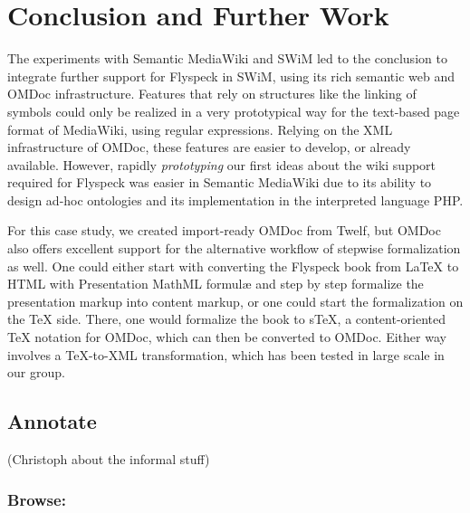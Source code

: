 
\section{Conclusion and Further Work}
\label{sec:conc}

The experiments with Semantic MediaWiki and SWiM led to the conclusion to
integrate further support for Flyspeck in SWiM, using its rich semantic web and
OMDoc infrastructure.  Features that rely on structures like the linking
of symbols could only be realized in a very prototypical way for the text-based
page format of MediaWiki, using regular expressions.  Relying on the XML
infrastructure of OMDoc, these features are easier to develop, or already
available.  However, rapidly \emph{prototyping} our first ideas about the wiki
support required for Flyspeck was easier in Semantic MediaWiki due to its
ability to design ad-hoc ontologies and its implementation in the interpreted
language PHP.

For this case study, we created import-ready OMDoc from Twelf, but OMDoc also
offers excellent support for the alternative workflow of stepwise formalization
as well\cite[chap.\ 4]{Kohlhase:omdoc1.2}.  One could either start with
converting the Flyspeck book from {\LaTeX} to HTML with Presentation MathML
formulæ and step by step formalize the presentation markup into content markup,
or one could start the formalization on the {\TeX} side.  There, one would
formalize the book to s\TeX{}, a content-oriented {\TeX} notation for OMDoc,
which can then be converted to OMDoc\cite{Kohlhase:albwo06}.  Either way
involves a {\TeX}-to-XML transformation, which has been tested in large scale in
our group\cite{URL:arXMLiv}.

\subsection{Annotate}

(Christoph about the informal stuff)



\subsubsection{Browse: }





